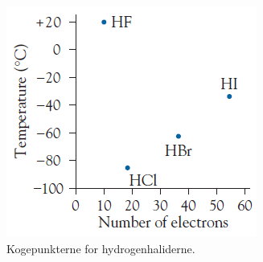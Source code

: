 \begin{figure}[t]
	\centering
	\includegraphics[width=\columnwidth]{Atom-ogMolekylefysik/billeder/HX-kogepunkt.png}
	\caption{Kogepunkterne for hydrogenhaliderne.} %
	\label{fig:HX-kogepunkt}
\end{figure}

